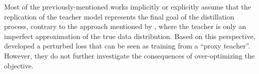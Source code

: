 
Most of the previously-mentioned works implicitly or explicitly assume that the replication of the teacher model represents the final goal of the distillation process, contrary to the approach mentioned by \citet{menon2021statistical}, where the teacher is only an imperfect approximation of the true data distribution. Based on this perspective, \citet{zhang2023not} developed a perturbed loss that can be seen as training from a \enquote{proxy teacher}. However, they do not further investigate the consequences of over-optimizing the objective.
